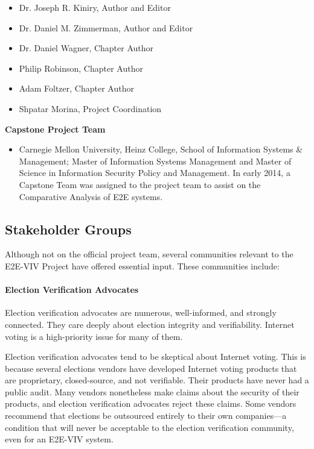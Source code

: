 \begin{itemize}

\item Dr. Joseph R. Kiniry, Author and Editor

\item Dr. Daniel M. Zimmerman, Author and Editor

\item Dr. Daniel Wagner, Chapter Author

\item Philip Robinson, Chapter Author

\item Adam Foltzer, Chapter Author

\item Shpatar Morina, Project Coordination

\end{itemize}

\textbf{Capstone Project Team}

\begin{itemize}

\item Carnegie Mellon University, Heinz College, School of Information
  Systems \& Management; Master of Information Systems Management and
  Master of Science in Information Security Policy and Management. In
  early 2014, a Capstone Team was assigned to the project team to
  assist on the Comparative Analysis of E2E systems.

\end{itemize}

\subsection{Stakeholder Groups}
\label{sec:stakeholder-groups}

Although not on the official project team, several communities
relevant to the E2E-VIV Project have offered essential input. These
communities include:

\paragraph{Election Verification Advocates}
Election verification advocates are numerous, well-informed, and
strongly connected. They care deeply about election integrity and
verifiability. Internet voting is a high-priority issue for many of
them.

Election verification advocates tend to be skeptical about Internet
voting. This is because several elections vendors have developed
Internet voting products that are proprietary, closed-source, and not
verifiable. Their products have never had a public audit. Many vendors
nonetheless make claims about the security of their products, and
election verification advocates reject these claims. Some vendors
recommend that elections be outsourced entirely to their own
companies---a condition that will never be acceptable to the election
verification community, even for an E2E-VIV system.

